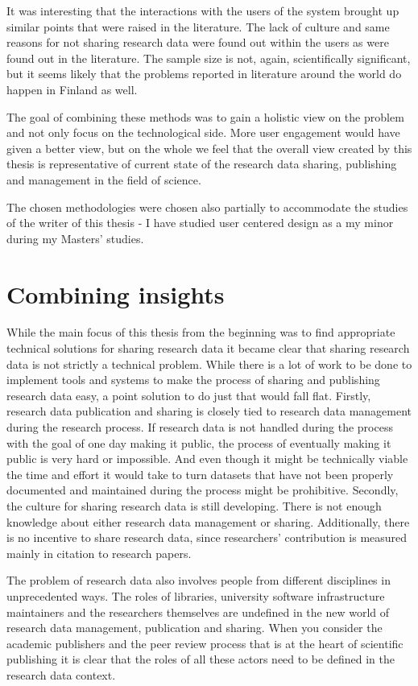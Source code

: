 It was interesting that the interactions with the users of the system brought
up similar points that were raised in the literature. The lack of culture and
same reasons for not sharing research data were found out within the users as were
found out in the literature.
The sample size is not, again, scientifically significant, but
it seems likely that the problems reported in literature around the world do
happen in Finland as well.

The goal of combining these methods was to gain a holistic view on the problem
and not only focus on the technological side. More user engagement would have
given a better view, but on the whole we feel that the overall view created by
this thesis is representative of current state of the research data sharing,
publishing and management in the field of science.

The chosen methodologies were chosen also partially to accommodate the studies
of the writer of this thesis - I have studied user centered design as a my
minor during my Masters' studies.

\section{Combining insights}

While the main focus of this thesis from the beginning was to find
appropriate technical solutions for sharing research data it became clear
that sharing research data is not strictly a technical problem. While there is
a lot of work to be done to implement tools and systems to make the process of
sharing and publishing research data easy, a point solution to do just that
would fall flat. Firstly, research data publication and sharing is closely
tied to research data management during the research process. If research data
is not handled during the process with the goal of one day making it public,
the process of eventually making it public is very hard or impossible. And even
though it might be technically viable the time and effort it would take to
turn datasets that have not been properly documented and maintained during the
process might be prohibitive. Secondly, the culture for sharing research data
is still developing. There is not enough knowledge about either research data management
or sharing. Additionally, there is no incentive to share research data, since
researchers' contribution is measured mainly in citation to research papers.

The problem of research data also involves people from different disciplines
in unprecedented ways. The roles of libraries, university software
infrastructure maintainers and the researchers themselves are undefined in
the new world of research data management, publication and sharing. When you
consider the academic publishers and the peer review process that is at the
heart of scientific publishing it is clear that the roles of all
these actors need to be defined in the research data context.

